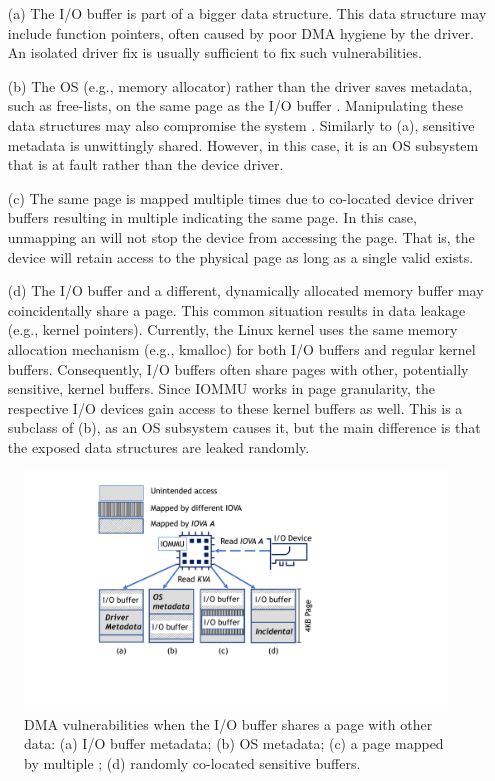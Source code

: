 \begin{enumerate}
    \item[(a)] The I/O buffer is part of a bigger data structure. This data structure may include function pointers, often caused by poor DMA hygiene by the driver. An isolated driver fix is usually sufficient to fix such vulnerabilities.
    \item[(b)] The OS (e.g., memory allocator) rather than the driver saves metadata, such as free-lists, on the same page as the I/O buffer \cite{Cor07}. Manipulating these data structures may also compromise the system \cite{ak09}. Similarly to (a), sensitive metadata is unwittingly shared. However, in this case, it is an OS subsystem that is at fault rather than the device driver.
    \item[(c)] The same page is mapped multiple times due to co-located device driver buffers resulting in multiple \iova{} indicating the same page. 
    In this case, unmapping an \iova will not stop the device from accessing the page.
    That is, the device will retain access to the physical page as long as a single valid \iova{} exists.
    \item[(d)] The I/O buffer and a different, dynamically allocated memory buffer may coincidentally share a page. This common situation results in data leakage (e.g., kernel pointers). Currently, the Linux kernel uses the same memory allocation mechanism (e.g., kmalloc) for both I/O buffers and regular kernel buffers. Consequently, I/O buffers often share pages with other, potentially sensitive, kernel buffers. Since IOMMU works in page granularity, the respective I/O devices gain access to these kernel buffers as well. This is a subclass of (b), as an OS subsystem causes it, but the main difference is that the exposed data structures are leaked randomly.

\end{enumerate}

\begin{figure}[t]
    \centering
    \includegraphics[width=0.8\columnwidth]{figs/subpage.pdf}
    \caption{\subpage{} DMA vulnerabilities when the I/O buffer shares a page with other data: (a) I/O buffer metadata; (b) OS
metadata; (c) a page mapped by multiple \iova; (d) randomly co-located sensitive buffers.}
    \label{fig:colocation}
\end{figure}


